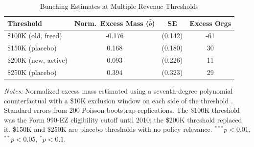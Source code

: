 \begin{table}[htbp]
\centering
\caption{Bunching Estimates at Multiple Revenue Thresholds}
\label{tab:bunching}
\begin{tabular}{lccc}
\hline\hline
Threshold & Norm.\ Excess Mass ($\hat{b}$) & SE & Excess Orgs \\
\hline
\$100K (old, freed) & -0.176 & (0.142) & -61 \\
\$150K (placebo) & 0.168 & (0.180) & 30 \\
\$200K (new, active) & 0.093 & (0.226) & 11 \\
\$250K (placebo) & 0.394 & (0.323) & 29 \\
\hline\hline
\end{tabular}
\begin{tablenotes}
\item \textit{Notes:} Normalized excess mass estimated using a seventh-degree polynomial 
counterfactual with a \$10K exclusion window on each side of the threshold 
\citep{kleven2016bunching}. Standard errors from 200 Poisson bootstrap replications. 
The \$100K threshold was the Form 990-EZ eligibility cutoff until 2010; the \$200K 
threshold replaced it. \$150K and \$250K are placebo thresholds with no policy relevance. 
$^{***}p<0.01$, $^{**}p<0.05$, $^{*}p<0.1$.
\end{tablenotes}
\end{table}
